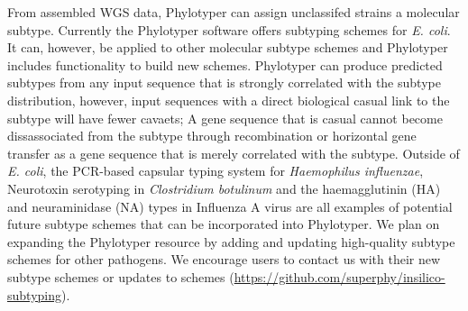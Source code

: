 \documentclass{bioinfo}
\begin{document}
From assembled WGS data, Phylotyper can assign unclassifed strains a molecular subtype.
Currently the Phylotyper software offers subtyping schemes for \textit{E. coli}.
It can, however, be applied to other molecular subtype schemes and Phylotyper includes functionality to build new schemes.
Phylotyper can produce predicted subtypes from any input sequence that is strongly correlated with the subtype distribution, however, input sequences with a direct biological casual link to the subtype will have fewer cavaets; A gene sequence that is casual cannot become dissassociated from the subtype through recombination or horizontal gene transfer as a gene sequence that is merely correlated with the subtype.
Outside of \textit{E. coli}, the PCR-based capsular typing system for \textit{Haemophilus influenzae}, Neurotoxin serotyping in \textit{Clostridium botulinum} and the haemagglutinin (HA) and neuraminidase (NA) types in Influenza A virus are all examples of potential future subtype schemes that can be incorporated into Phylotyper.
We plan on expanding the Phylotyper resource by adding and updating high-quality subtype schemes for other pathogens.
We encourage users to contact us with their new subtype schemes or updates to schemes (\url{https://github.com/superphy/insilico-subtyping}).
\end{document}

